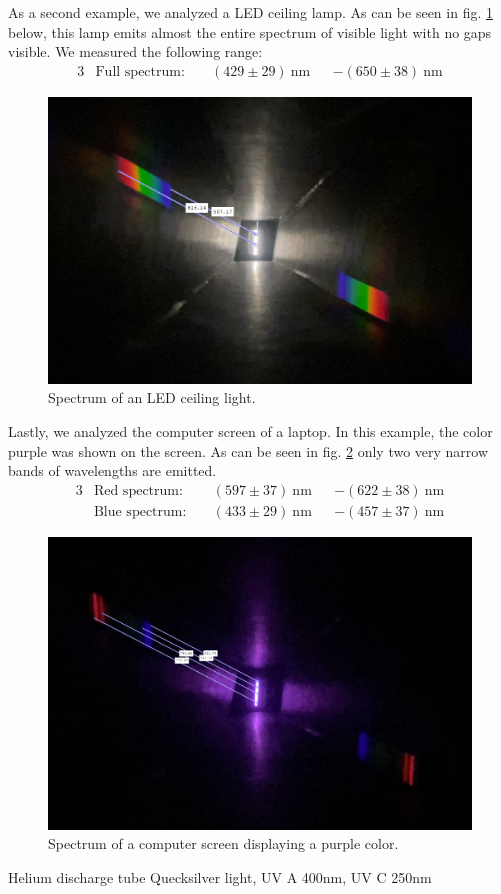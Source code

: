 As a second example, we analyzed a LED ceiling lamp. As can be seen in fig. \ref{fig_lamp2} below, this lamp
emits almost the entire spectrum of visible light with no gaps visible. We measured the following range:
\begin{alignat}{3}
    &\text{Full spectrum:} \; &&(429 \pm 29)~\si{\nano\meter} & &- (650 \pm 38)~\si{\nano\meter} \nonumber
\end{alignat}
\begin{figure}[H]
    \centering
    \includegraphics[scale = 0.41]{src/images/lamp2_meas.png}
    \caption{Spectrum of an LED ceiling light.}
    \label{fig_lamp2}
\end{figure}

Lastly, we analyzed the computer screen of a laptop. In this example, the color purple was shown on the screen.
As can be seen in fig. \ref{fig_purple_screen} only two very narrow bands of wavelengths are emitted.
\begin{alignat}{3}
    &\text{Red spectrum:} \; &&(597 \pm 37)~\si{\nano\meter} & &- (622 \pm 38)~\si{\nano\meter} \nonumber\\
    &\text{Blue spectrum:} \; &&(433 \pm 29)~\si{\nano\meter} & &- (457 \pm 37)~\si{\nano\meter} \nonumber
\end{alignat}
\begin{figure}[H]
    \centering
    \includegraphics[scale = 0.25]{src/images/purple_screen_meas.png}
    \caption{Spectrum of a computer screen displaying a purple color.}
    \label{fig_purple_screen}
\end{figure}

Helium discharge tube
Quecksilver light, UV A 400nm, UV C 250nm